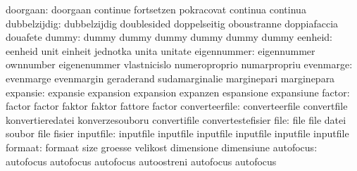                  doorgaan: doorgaan                  continue
                           fortsetzen                pokracovat
                           continua                  continua
             dubbelzijdig: dubbelzijdig              doublesided
                           doppelseitig              oboustranne
                           doppiafaccia              douafete
                    dummy: dummy                     dummy
                           dummy                     dummy
                           dummy                     dummy
                  eenheid: eenheid                   unit
                           einheit                   jednotka
                           unita                     unitate
              eigennummer: eigennummer               ownnumber
                           eigenenummer              vlastnicislo
                           numeroproprio             numarpropriu
                evenmarge: evenmarge                 evenmargin
                           geraderand                sudamarginalie
                           marginepari               marginepara
                 expansie: expansie                  expansion
                           expansion                 expanzen
                           espansione                expansiune
                   factor: factor                    factor
                           faktor                    faktor
                           fattore                   factor
           converteerfile: converteerfile            convertfile
                           konvertieredatei          konverzesouboru
                           convertifile              convertestefisier
                     file: file                      file
                           datei                     soubor
                           file                      fisier
                inputfile: inputfile                 inputfile
                           inputfile                 inputfile
                           inputfile                 inputfile %
                  formaat: formaat                   size
                           groesse                   velikost
                           dimensione                dimensiune
                autofocus: autofocus                 autofocus
                           autofocus                 autoostreni
                           autofocus                 autofocus
